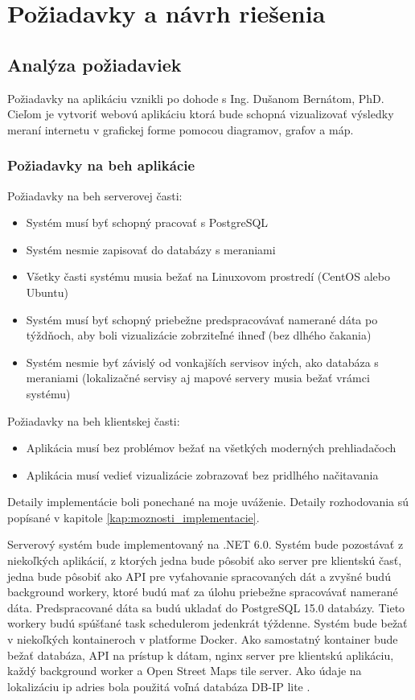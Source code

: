 \chapter{Požiadavky a návrh riešenia}

\label{kap:navrh_riesenia}

\section{Analýza požiadaviek}

Požiadavky na aplikáciu vznikli po dohode s Ing. Dušanom Bernátom, PhD. Cieľom je vytvoriť webovú 
aplikáciu ktorá bude schopná vizualizovať výsledky meraní internetu v grafickej forme pomocou diagramov, 
grafov a máp. 

\subsection{Požiadavky na beh aplikácie}

Požiadavky na beh serverovej časti:
\begin{itemize}
    \item Systém musí byť schopný pracovať s PostgreSQL
    \item Systém nesmie zapisovať do databázy s meraniami
    \item Všetky časti systému musia bežať na Linuxovom prostredí (CentOS alebo Ubuntu)
    \item Systém musí byť schopný priebežne predspracovávať namerané dáta po týždňoch, 
    aby boli vizualizácie zobrziteľné ihneď (bez dlhého čakania)
    \item Systém nesmie byť závislý od vonkajších servisov iných, ako databáza s meraniami 
    (lokalizačné servisy aj mapové servery musia bežať vrámci systému)
\end{itemize}
Požiadavky na beh klientskej časti:
\begin{itemize}
    \item Aplikácia musí bez problémov bežať na všetkých moderných prehliadačoch
    \item Aplikácia musí vedieť vizualizácie zobrazovať bez pridlhého načitavania
\end{itemize}

Detaily implementácie boli ponechané na moje uváženie. Detaily rozhodovania sú popísané v kapitole \ref{kap:moznosti_implementacie}.

Serverový systém bude implementovaný na .NET 6.0. Systém bude pozostávať z niekoľkých aplikácií, z ktorých jedna bude pôsobiť ako 
server pre klientskú časť, jedna bude pôsobiť ako API pre vyťahovanie spracovaných dát a zvyšné budú background workery, ktoré budú mať za úlohu
priebežne spracovávať namerané dáta. Predspracované dáta sa budú ukladať do PostgreSQL 15.0 databázy. Tieto workery budú spúšťané task schedulerom
jedenkrát týždenne. Systém bude bežať v niekoľkých kontaineroch v platforme Docker. Ako samostatný kontainer bude bežať databáza, API na prístup k 
dátam, nginx server pre klientskú aplikáciu, každý background worker a Open Street Maps tile server. Ako údaje na lokalizáciu ip adries bola 
použitá voľná databáza DB-IP lite \cite{ip_city_db}.

